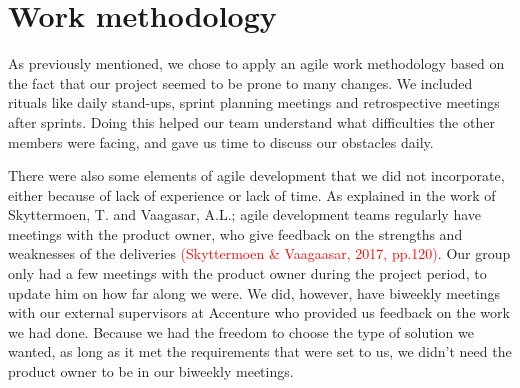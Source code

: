 \section{Work methodology}
As previously mentioned, we chose to apply an agile work methodology based on the fact that our project seemed to be prone to many changes. We included rituals like daily stand-ups, sprint planning meetings and retrospective meetings after sprints. Doing this helped our team understand what difficulties the other members were facing, and gave us time to discuss our obstacles daily. 

There were also some elements of agile development that we did not incorporate, either because of lack of experience or lack of time. As explained in the work of  Skyttermoen, T. and Vaagasar, A.L.; agile development teams regularly have meetings with the product owner, who give feedback on the strengths and weaknesses of the deliveries \textcolor{red}{(Skyttermoen & Vaagaasar, 2017, pp.120)}. Our group only had a few meetings with the product owner during the project period, to update him on how far along we were. We did, however,  have biweekly meetings with our external supervisors at Accenture who provided us feedback on the work we had done. Because we had the freedom to choose the type of solution we wanted, as long as it met the requirements that were set to us, we didn’t need the product owner to be in our biweekly meetings. 